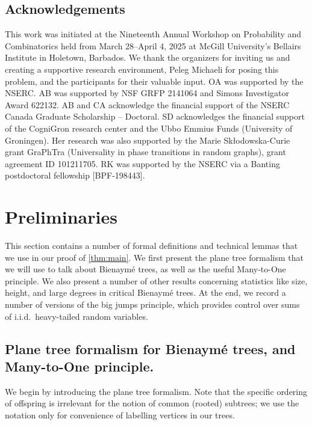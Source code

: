 \documentclass[11pt,reqno]{amsart}
\newcommand{\1}{\mathbf{1}}
\newcommand{\0}{\mathbf{0}}
\begin{document}
\subsection*{Acknowledgements}
This work was initiated at the  Nineteenth Annual Workshop on Probability and Combinatorics held from March 28--April 4, 2025 at McGill University's Bellairs Institute in Holetown, Barbados. We thank the organizers for inviting us and creating a supportive research environment, Peleg Michaeli for posing this problem, and the participants for their valuable input. OA was supported by the NSERC. %
AB was supported by NSF GRFP 2141064 and Simons Investigator Award 622132. AB and CA acknowledge the financial support of the NSERC Canada Graduate Scholarship -- Doctoral. SD acknowledges the financial support of the CogniGron research center and the Ubbo Emmius Funds (University of Groningen). Her research was also supported by
the Marie Skłodowska-Curie grant GraPhTra (Universality in phase transitions in random
graphs), grant agreement ID 101211705. RK was supported by the NSERC via a Banting postdoctoral fellowship [BPF-198443].

\section{Preliminaries}
\label{sec:preliminaries}

This section contains a number of formal definitions and technical lemmas that we use in our proof of \cref{thm:main}. We first present the plane tree formalism that we will use to talk about Bienaym\'{e} trees, as well as the useful Many-to-One principle. We also present a number of other results concerning statistics like size, height, and large degrees in critical Bienaym\'{e} trees. At the end, we record a number of versions of the big jumps principle, which provides control over sums of i.i.d.~heavy-tailed random variables.

\subsection{Plane tree formalism for Bienaymé trees, and Many-to-One principle.}

We begin by introducing the plane tree formalism. Note that the specific ordering of offspring is irrelevant for the notion of common (rooted) subtrees; we use the notation only for convenience of labelling vertices in our trees.
\end{document}

